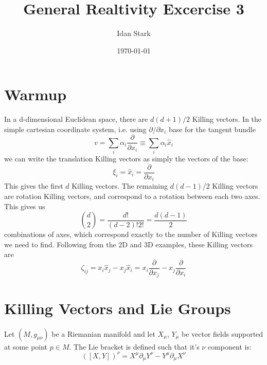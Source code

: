 \documentclass{article}
\title{General Realtivity Excercise 3}
\author{Idan Stark}
\date{\today}
\begin{document}
\maketitle

\section{Warmup}
In a d-dimensional Euclidean space, there are $d(d+1)/2$ Killing vectors. In the simple cartesian coordinate system, i.e. using $\partial/\partial x_i$ base for the tangent bundle
\begin{equation}
    v = \sum_i \alpha_i \frac{\partial}{\partial x_i} \equiv \sum_i \alpha_i \hat{x}_i
\end{equation}
we can write the translation Killing vectors as simply the vectors of the base:
\begin{equation}
    \xi_i = \hat{x}_i = \frac{\partial}{\partial x_i}
\end{equation}
This gives the first $d$ Killing vectors. The remaining $d(d-1)/2$ Killing vectors are rotation Killing vectors, and correspond to a rotation between each two axes. This gives us
\begin{equation}
    \binom{d}{2} = \frac{d!}{(d-2)!2!} = \frac{d(d-1)}{2}
\end{equation}
combinations of axes, which correspond exactly to the number of Killing vectors we need to find. Following from the 2D and 3D examples, these Killing vectors are
\begin{equation}
    \zeta_{ij} = x_i \hat{x}_j - x_j \hat{x}_i = x_i \frac{\partial}{\partial x_j} - x_j \frac{\partial}{\partial x_i}
\end{equation}

\section{Killing Vectors and Lie Groups}
Let $(M, g_{\mu\nu})$ be a Riemanian manifold and let $X_\mu$, $Y_\mu$ be vector fields supported at some point $p \in M$. The Lie bracket is defined such that it's $\nu$ component is:
\begin{equation}
\label{eq:lie_bracket_def}
    \left(\left[X, Y\right]\right)^\nu = X^\mu\partial_\mu Y^\nu - Y^\mu\partial_\mu X^\nu
\end{equation}
\end{document}
